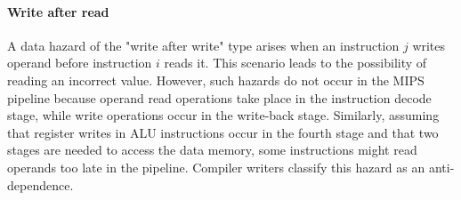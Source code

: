 \paragraph*{Write after read}
A data hazard of the "write after write" type arises when an instruction $j$ writes operand before instruction $i$ reads it. 
This scenario leads to the possibility of reading an incorrect value. However, such hazards do not occur in the MIPS pipeline because operand read operations take place in the instruction decode stage, while write operations occur in the write-back stage.
Similarly, assuming that register writes in ALU instructions occur in the fourth stage and that two stages are needed to access the data memory, some instructions might read operands too late in the pipeline.
Compiler writers classify this hazard as an anti-dependence.